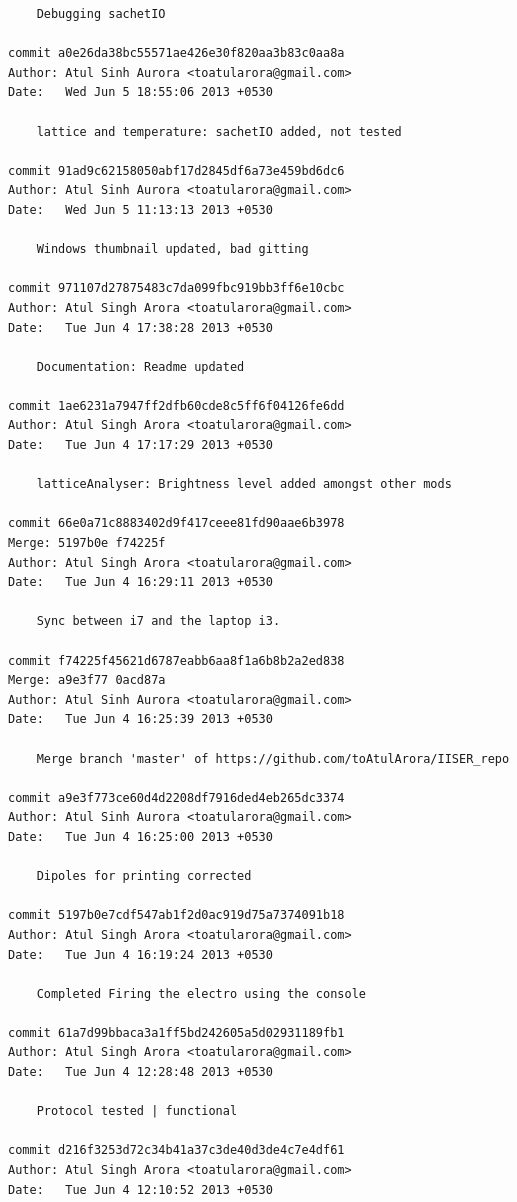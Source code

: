 \begin{lstlisting}
    Debugging sachetIO

commit a0e26da38bc55571ae426e30f820aa3b83c0aa8a
Author: Atul Sinh Aurora <toatularora@gmail.com>
Date:   Wed Jun 5 18:55:06 2013 +0530

    lattice and temperature: sachetIO added, not tested

commit 91ad9c62158050abf17d2845df6a73e459bd6dc6
Author: Atul Sinh Aurora <toatularora@gmail.com>
Date:   Wed Jun 5 11:13:13 2013 +0530

    Windows thumbnail updated, bad gitting

commit 971107d27875483c7da099fbc919bb3ff6e10cbc
Author: Atul Singh Arora <toatularora@gmail.com>
Date:   Tue Jun 4 17:38:28 2013 +0530

    Documentation: Readme updated

commit 1ae6231a7947ff2dfb60cde8c5ff6f04126fe6dd
Author: Atul Singh Arora <toatularora@gmail.com>
Date:   Tue Jun 4 17:17:29 2013 +0530

    latticeAnalyser: Brightness level added amongst other mods

commit 66e0a71c8883402d9f417ceee81fd90aae6b3978
Merge: 5197b0e f74225f
Author: Atul Singh Arora <toatularora@gmail.com>
Date:   Tue Jun 4 16:29:11 2013 +0530

    Sync between i7 and the laptop i3.

commit f74225f45621d6787eabb6aa8f1a6b8b2a2ed838
Merge: a9e3f77 0acd87a
Author: Atul Sinh Aurora <toatularora@gmail.com>
Date:   Tue Jun 4 16:25:39 2013 +0530

    Merge branch 'master' of https://github.com/toAtulArora/IISER_repo

commit a9e3f773ce60d4d2208df7916ded4eb265dc3374
Author: Atul Sinh Aurora <toatularora@gmail.com>
Date:   Tue Jun 4 16:25:00 2013 +0530

    Dipoles for printing corrected

commit 5197b0e7cdf547ab1f2d0ac919d75a7374091b18
Author: Atul Singh Arora <toatularora@gmail.com>
Date:   Tue Jun 4 16:19:24 2013 +0530

    Completed Firing the electro using the console

commit 61a7d99bbaca3a1ff5bd242605a5d02931189fb1
Author: Atul Singh Arora <toatularora@gmail.com>
Date:   Tue Jun 4 12:28:48 2013 +0530

    Protocol tested | functional

commit d216f3253d72c34b41a37c3de40d3de4c7e4df61
Author: Atul Singh Arora <toatularora@gmail.com>
Date:   Tue Jun 4 12:10:52 2013 +0530


\end{lstlisting}
